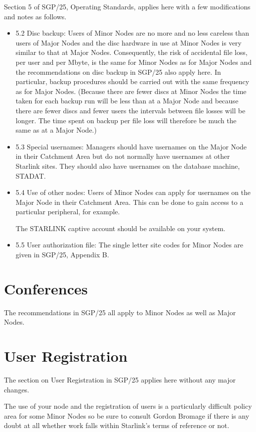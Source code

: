 Section 5 of SGP/25, Operating Standards, applies here with a few modifications
and notes as follows.
\begin{itemize}
\item 5.2 Disc backup: Users of Minor Nodes are no more and no less careless
than users of Major Nodes and the disc hardware in use at Minor Nodes is very
similar to that at Major Nodes.  Consequently, the risk of accidental file
loss, per user and per Mbyte, is the same for Minor Nodes as for
Major Nodes and the recommendations on disc backup in SGP/25 also apply here.
In particular, backup procedures should be carried out with the same frequency
as for Major Nodes.
(Because there are fewer discs at Minor Nodes the time taken for each backup
run will be less than at a Major Node and because there are fewer discs and
fewer users the intervals between file losses will be longer.  The time spent
on backup per file loss will therefore be much the same as at a Major Node.)
\item 5.3 Special usernames: Managers should have usernames on the Major Node in
their Catchment Area but do not normally have usernames at other Starlink sites.
They should also have usernames on the database machine, STADAT.
\item 5.4 Use of other nodes: Users of Minor Nodes can apply for usernames on
the Major Node in their Catchment Area.
This can be done to gain access to a particular peripheral, for example.

The STARLINK captive account should be available on your system.
\item 5.5 User authorization file: The single letter site codes for Minor
Nodes are given in SGP/25, Appendix B.
\end{itemize}

\section {Conferences}

The recommendations in SGP/25 all apply to Minor Nodes as well as Major Nodes.

\section {User Registration}

The section on User Registration in SGP/25 applies here without any major
changes.

The use of your node and the registration of users is a particularly difficult
policy area for some Minor Nodes so be sure to consult Gordon Bromage if there
is any doubt at all whether work falls within Starlink's terms of reference
or not.

